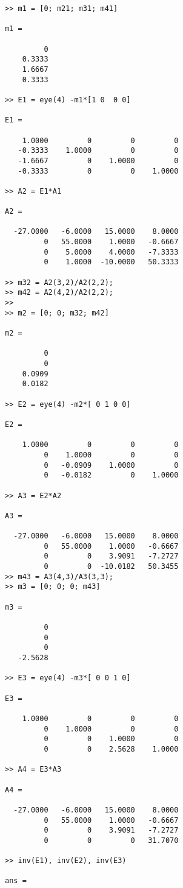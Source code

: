 \begin{enumerate}
\begin{svol}
\begin{codice}
\begin{verbatim}
>> m1 = [0; m21; m31; m41]

m1 =

         0
    0.3333
    1.6667
    0.3333

>> E1 = eye(4) -m1*[1 0  0 0]

E1 =

    1.0000         0         0         0
   -0.3333    1.0000         0         0
   -1.6667         0    1.0000         0
   -0.3333         0         0    1.0000

>> A2 = E1*A1

A2 =

  -27.0000   -6.0000   15.0000    8.0000
         0   55.0000    1.0000   -0.6667
         0    5.0000    4.0000   -7.3333
         0    1.0000  -10.0000   50.3333

>> m32 = A2(3,2)/A2(2,2);
>> m42 = A2(4,2)/A2(2,2);
>> 
>> m2 = [0; 0; m32; m42]

m2 =

         0
         0
    0.0909
    0.0182

>> E2 = eye(4) -m2*[ 0 1 0 0]

E2 =

    1.0000         0         0         0
         0    1.0000         0         0
         0   -0.0909    1.0000         0
         0   -0.0182         0    1.0000

>> A3 = E2*A2

A3 =

  -27.0000   -6.0000   15.0000    8.0000
         0   55.0000    1.0000   -0.6667
         0         0    3.9091   -7.2727
         0         0  -10.0182   50.3455
>> m43 = A3(4,3)/A3(3,3);
>> m3 = [0; 0; 0; m43]

m3 =

         0
         0
         0
   -2.5628

>> E3 = eye(4) -m3*[ 0 0 1 0]

E3 =

    1.0000         0         0         0
         0    1.0000         0         0
         0         0    1.0000         0
         0         0    2.5628    1.0000

>> A4 = E3*A3

A4 =

  -27.0000   -6.0000   15.0000    8.0000
         0   55.0000    1.0000   -0.6667
         0         0    3.9091   -7.2727
         0         0         0   31.7070

>> inv(E1), inv(E2), inv(E3)

ans =


\end{verbatim}
\end{codice}
\end{svol}
\end{enumerate}
